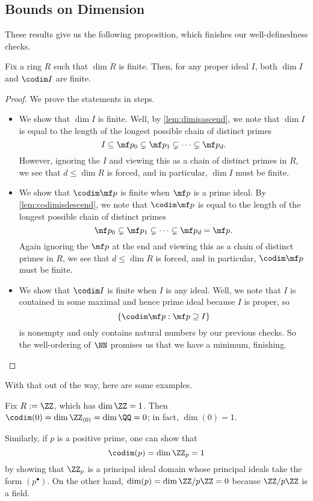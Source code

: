 \subsection{Bounds on Dimension}
These results give us the following proposition, which finishes our well-definedness checks.
\begin{prop}
	Fix a ring $R$ such that $\dim R$ is finite. Then, for any proper ideal $I$, both $\dim I$ and $\codim I$ are finite.
\end{prop}
\begin{proof}
	We prove the statements in steps.
	\begin{itemize}
		\item We show that $\dim I$ is finite. Well, by \autoref{lem:dimisascend}, we note that $\dim I$ is equal to the length of the longest possible chain of distinct primes
		\[I\subseteq\mf p_0\subsetneq\mf p_1\subsetneq\cdots\subsetneq\mf p_d.\]
		However, ignoring the $I$ and viewing this as a chain of distinct primes in $R$, we see that $d\le\dim R$ is forced, and in particular, $\dim I$ must be finite.
		\item We show that $\codim\mf p$ is finite when $\mf p$ is a prime ideal. By \autoref{lem:codimisdescend}, we note that $\codim\mf p$ is equal to the length of the longest possible chain of distinct primes
		\[\mf p_0\subsetneq\mf p_1\subsetneq\cdots\subsetneq\mf p_d=\mf p.\]
		Again ignoring the $\mf p$ at the end and viewing this as a chain of distinct primes in $R$, we see that $d\le\dim R$ is forced, and in particular, $\codim\mf p$ must be finite.
		\item We show that $\codim I$ is finite when $I$ is any ideal. Well, we note that $I$ is contained in some maximal and hence prime ideal because $I$ is proper, so
		\[\{\codim\mf p:\mf p\supseteq I\}\]
		is nonempty and only contains natural numbers by our previous checks. So the well-ordering of $\NN$ promises us that we have a minimum, finishing.
		\qedhere
	\end{itemize}
\end{proof}
With that out of the way, here are some examples.
\begin{example}
	Fix $R:=\ZZ$, which has $\dim\ZZ=1$. Then $\codim(0)=\dim\ZZ_{(0)}=\dim\QQ=0$; in fact, $\dim(0)=1$.
\end{example}
\begin{example}
	Similarly, if $p$ is a positive prime, one can show that
	\[\codim(p)=\dim\ZZ_p=1\]
	by showing that $\ZZ_p$ is a principal ideal domain whose principal ideals take the form $\left(p^\bullet\right)$. On the other hand, $\dim(p)=\dim\ZZ/p\ZZ=0$ because $\ZZ/p\ZZ$ is a field.
\end{example}
